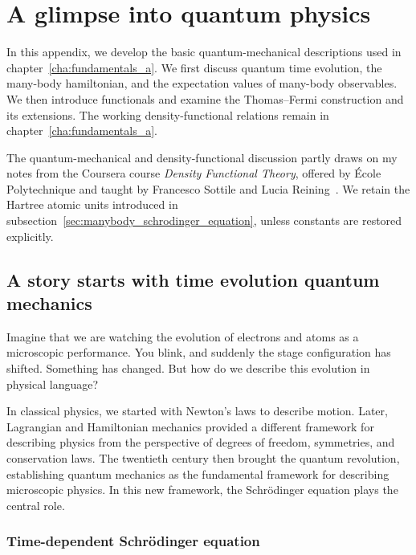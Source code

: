 \chapter{A glimpse into quantum physics}
\label{cha:appendix_quantum}

In this appendix, we develop the basic quantum-mechanical descriptions used in chapter~\ref{cha:fundamentals_a}.
We first discuss quantum time evolution, the many-body hamiltonian, and the expectation values of many-body observables.
We then introduce functionals and examine the Thomas--Fermi construction and its extensions.
The working density-functional relations remain in chapter~\ref{cha:fundamentals_a}.

The quantum-mechanical and density-functional discussion partly draws on my notes from the Coursera course \textit{Density Functional Theory}, offered by École Polytechnique and taught by Francesco Sottile and Lucia Reining~\cite{sottile_reining_dft_coursera}.
We retain the Hartree atomic units introduced in subsection~\ref{sec:manybody_schrodinger_equation}, unless constants are restored explicitly.

\newpage
\section{A story starts with time evolution quantum mechanics}
\label{sec:time_evolution_quantum_mechanics}

Imagine that we are watching the evolution of electrons and atoms as a microscopic performance.
You blink, and suddenly the stage configuration has shifted.
Something has changed. But how do we describe this evolution in physical language?

In classical physics, we started with Newton's laws to describe motion.
Later, Lagrangian and Hamiltonian mechanics provided a different framework for describing physics from the perspective of degrees of freedom, symmetries, and conservation laws.
The twentieth century then brought the quantum revolution, establishing quantum mechanics as the fundamental framework for describing microscopic physics.
In this new framework, the Schrödinger equation plays the central role.

\subsection{Time-dependent Schrödinger equation}

